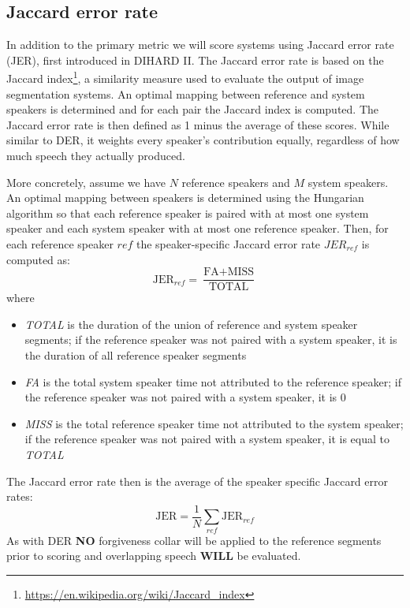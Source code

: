 \documentclass{article}
\begin{document}
\subsection{Jaccard error rate}
In addition to the primary metric we will score systems using Jaccard error rate (JER), first introduced in DIHARD II. The Jaccard error rate is based on the Jaccard index\footnote{\url{https://en.wikipedia.org/wiki/Jaccard_index}}, a similarity measure used to evaluate the output of image segmentation systems. An optimal mapping between reference and system speakers is determined and for each pair the Jaccard index is computed. The Jaccard error rate is then defined as 1 minus the average of these scores. While similar to DER, it weights every speaker's contribution equally, regardless of how much speech they actually produced.

More concretely, assume we have $N$ reference speakers and $M$ system speakers. An optimal mapping between speakers is determined using the Hungarian algorithm so that each reference speaker is paired with at most one system speaker and each system speaker with at most one reference speaker. Then, for each reference speaker $ref$ the speaker-specific Jaccard error rate $JER_{ref}$ is computed as:
    \begin{equation*}
        \textrm{JER}_{ref} = \frac{\textrm{FA} + \textrm{MISS}}{\textrm{TOTAL}}
    \end{equation*}
where
\begin{itemize}
    \item {\it TOTAL} is the duration of the union of reference and system speaker segments; if the reference speaker was not paired with a system speaker, it is the duration of all reference speaker segments
    \item {\it FA} is the total system speaker time not attributed to the reference speaker; if the reference speaker was not paired with a system speaker, it is 0
    \item {\it MISS} is the total reference speaker time not attributed to the system speaker; if the reference speaker was not paired with a system speaker, it is equal to {\it TOTAL}
\end{itemize}
The Jaccard error rate then is the average of the speaker specific Jaccard error rates:
    \begin{equation*}
        \textrm{JER} = \frac{1}{N}\sum_{ref}\textrm{JER}_{ref}
    \end{equation*}
As with DER {\bf NO} forgiveness collar will be applied to the reference segments prior to scoring and overlapping speech {\bf WILL} be evaluated.
\end{document}
